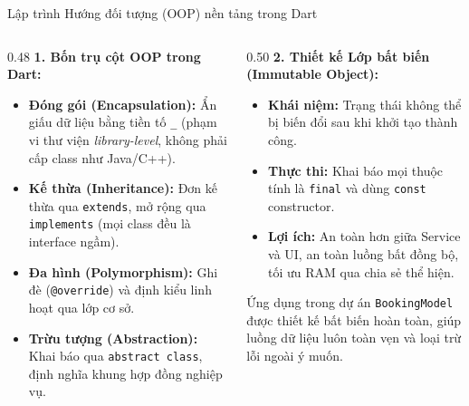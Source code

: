 \documentclass[aspectratio=169, 10pt]{beamer}
\begin{document}
\begin{frame}{Lập trình Hướng đối tượng (OOP) nền tảng trong Dart}
\begin{columns}[c,onlytextwidth]
\begin{column}{0.48\textwidth}
\textbf{1. Bốn trụ cột OOP trong Dart:}
\begin{itemize}\setlength{\itemsep}{0.1em}
  \item \textbf{Đóng gói (Encapsulation):} Ẩn giấu dữ liệu bằng tiền tố \texttt{\_} (phạm vi thư viện \textit{library-level}, không phải cấp class như Java/C++).
  \item \textbf{Kế thừa (Inheritance):} Đơn kế thừa qua \texttt{extends}, mở rộng qua \texttt{implements} (mọi class đều là interface ngầm).
  \item \textbf{Đa hình (Polymorphism):} Ghi đè (\texttt{@override}) và định kiểu linh hoạt qua lớp cơ sở.
  \item \textbf{Trừu tượng (Abstraction):} Khai báo qua \texttt{abstract class}, định nghĩa khung hợp đồng nghiệp vụ.
\end{itemize}
\end{column}

\begin{column}{0.50\textwidth}
\textbf{2. Thiết kế Lớp bất biến (Immutable Object):}
\begin{itemize}\setlength{\itemsep}{0.1em}
  \item \textbf{Khái niệm:} Trạng thái không thể bị biến đổi sau khi khởi tạo thành công.
  \item \textbf{Thực thi:} Khai báo mọi thuộc tính là \texttt{final} và dùng \texttt{const} constructor.
  \item \textbf{Lợi ích:} An toàn hơn giữa Service và UI, an toàn luồng bất đồng bộ, tối ưu RAM qua chia sẻ thể hiện.
\end{itemize}
\vspace{0.1cm}
\begin{block}{\footnotesize Ứng dụng trong dự án}
\footnotesize \texttt{BookingModel} được thiết kế bất biến hoàn toàn, giúp luồng dữ liệu luôn toàn vẹn và loại trừ lỗi ngoài ý muốn.
\end{block}
\end{column}
\end{columns}
\end{frame}
\end{document}
